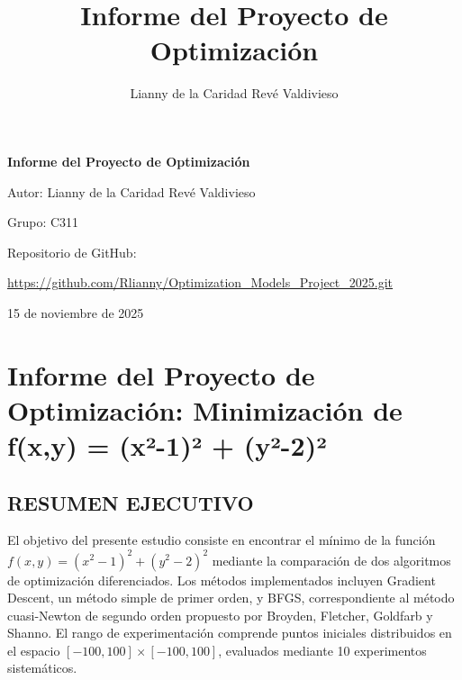 \documentclass[12pt,a4paper]{article}
\title{Informe del Proyecto de Optimización}
\author{Lianny de la Caridad Revé Valdivieso}
\date{}
\begin{document}
\begin{titlepage}
    \centering
    \vspace*{3cm}
    
    {\Huge\bfseries Informe del Proyecto de Optimización\par}
    
    \vspace{2cm}
    
    {\Large Autor: Lianny de la Caridad Revé Valdivieso\par}
    
    \vspace{1cm}
    
    {\Large Grupo: C311\par}
    
    \vspace{3cm}
    
    {\large Repositorio de GitHub:\par}
    \vspace{0.5cm}
    {\large\url{https://github.com/Rlianny/Optimization_Models_Project_2025.git}\par}
    
    \vfill
    
    {\large 15 de noviembre de 2025\par}
\end{titlepage}

\newpage


\section*{Informe del Proyecto de Optimización: Minimización de f(x,y) = (x²-1)² + (y²-2)²}

\subsection*{RESUMEN EJECUTIVO}

El objetivo del presente estudio consiste en encontrar el mínimo de la función $f(x,y) = (x^2-1)^2 + (y^2-2)^2$ mediante la comparación de dos algoritmos de optimización diferenciados. Los métodos implementados incluyen Gradient Descent, un método simple de primer orden, y BFGS, correspondiente al método cuasi-Newton de segundo orden propuesto por Broyden, Fletcher, Goldfarb y Shanno. El rango de experimentación comprende puntos iniciales distribuidos en el espacio $[-100, 100] \times [-100, 100]$, evaluados mediante 10 experimentos sistemáticos.
\end{document}
